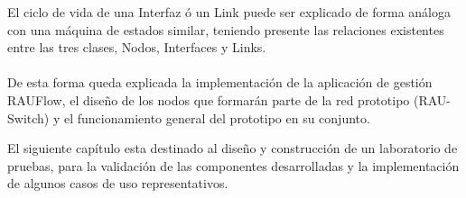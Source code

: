 El ciclo de vida de una Interfaz \'o un Link puede ser explicado de forma an\'aloga con una m\'aquina de estados similar, teniendo presente las relaciones existentes entre las tres clases, Nodos, Interfaces y Links.\\ \\

De esta forma queda explicada la implementaci\'on de la aplicaci\'on de gesti\'on RAUFlow, el diseño de  los nodos que formar\'an parte de la red prototipo (RAU-Switch) y el funcionamiento general del prototipo en su conjunto. 

El siguiente cap\'itulo esta destinado al diseño y construcción de un laboratorio de pruebas, para la validaci\'on de las componentes desarrolladas y la implementaci\'on de algunos casos de uso representativos. 





